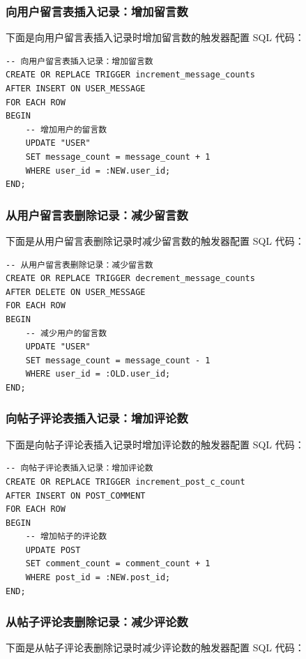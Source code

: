 \subsubsection{向用户留言表插入记录：增加留言数}

下面是向用户留言表插入记录时增加留言数的触发器配置 SQL 代码：

\begin{verbatim}
-- 向用户留言表插入记录：增加留言数
CREATE OR REPLACE TRIGGER increment_message_counts
AFTER INSERT ON USER_MESSAGE
FOR EACH ROW
BEGIN
    -- 增加用户的留言数
    UPDATE "USER"
    SET message_count = message_count + 1
    WHERE user_id = :NEW.user_id;
END;
\end{verbatim}

\subsubsection{从用户留言表删除记录：减少留言数}

下面是从用户留言表删除记录时减少留言数的触发器配置 SQL 代码：

\begin{verbatim}
-- 从用户留言表删除记录：减少留言数
CREATE OR REPLACE TRIGGER decrement_message_counts
AFTER DELETE ON USER_MESSAGE
FOR EACH ROW
BEGIN
    -- 减少用户的留言数
    UPDATE "USER"
    SET message_count = message_count - 1
    WHERE user_id = :OLD.user_id;
END;
\end{verbatim}

\subsubsection{向帖子评论表插入记录：增加评论数}

下面是向帖子评论表插入记录时增加评论数的触发器配置 SQL 代码：

\begin{verbatim}
-- 向帖子评论表插入记录：增加评论数
CREATE OR REPLACE TRIGGER increment_post_c_count
AFTER INSERT ON POST_COMMENT
FOR EACH ROW
BEGIN
    -- 增加帖子的评论数
    UPDATE POST
    SET comment_count = comment_count + 1
    WHERE post_id = :NEW.post_id;
END;
\end{verbatim}

\subsubsection{从帖子评论表删除记录：减少评论数}

下面是从帖子评论表删除记录时减少评论数的触发器配置 SQL 代码：

